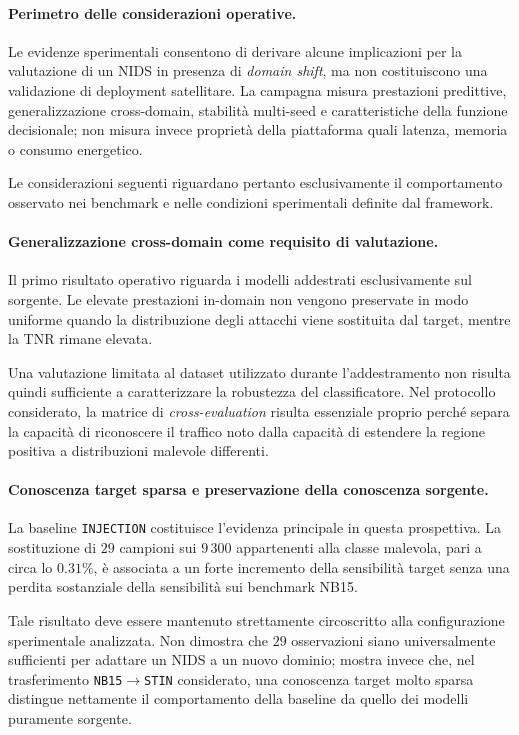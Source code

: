 \paragraph{Perimetro delle considerazioni operative.}
Le evidenze sperimentali consentono di derivare alcune implicazioni per la valutazione di un NIDS in presenza di \textit{domain shift}, ma non costituiscono una validazione di deployment satellitare. 
La campagna misura prestazioni predittive, generalizzazione cross-domain, stabilità multi-seed e caratteristiche della funzione decisionale; non misura invece proprietà della piattaforma quali latenza, memoria o consumo energetico.

Le considerazioni seguenti riguardano pertanto esclusivamente il comportamento osservato nei benchmark e nelle condizioni sperimentali definite dal framework.

\paragraph{Generalizzazione cross-domain come requisito di valutazione.}
Il primo risultato operativo riguarda i modelli addestrati esclusivamente sul sorgente. 
Le elevate prestazioni in-domain non vengono preservate in modo uniforme quando la distribuzione degli attacchi viene sostituita dal target, mentre la TNR rimane elevata.

Una valutazione limitata al dataset utilizzato durante l'addestramento non risulta quindi sufficiente a caratterizzare la robustezza del classificatore.
Nel protocollo considerato, la matrice di \textit{cross-evaluation} risulta essenziale proprio perché separa la capacità di riconoscere il traffico noto dalla capacità di estendere la regione positiva a distribuzioni malevole differenti.

\paragraph{Conoscenza target sparsa e preservazione della conoscenza sorgente.}
La baseline \texttt{INJECTION} costituisce l'evidenza principale in questa prospettiva. 
La sostituzione di $29$ campioni sui $9\,300$ appartenenti alla classe malevola, pari a circa lo $0.31\%$, è associata a un forte incremento della sensibilità target senza una perdita sostanziale della sensibilità sui benchmark NB15.

Tale risultato deve essere mantenuto strettamente circoscritto alla configurazione sperimentale analizzata. 
Non dimostra che $29$ osservazioni siano universalmente sufficienti per adattare un NIDS a un nuovo dominio; mostra invece che, nel trasferimento \texttt{NB15}$\rightarrow$\texttt{STIN} considerato, una conoscenza target molto sparsa distingue nettamente il comportamento della baseline da quello dei modelli puramente sorgente.

